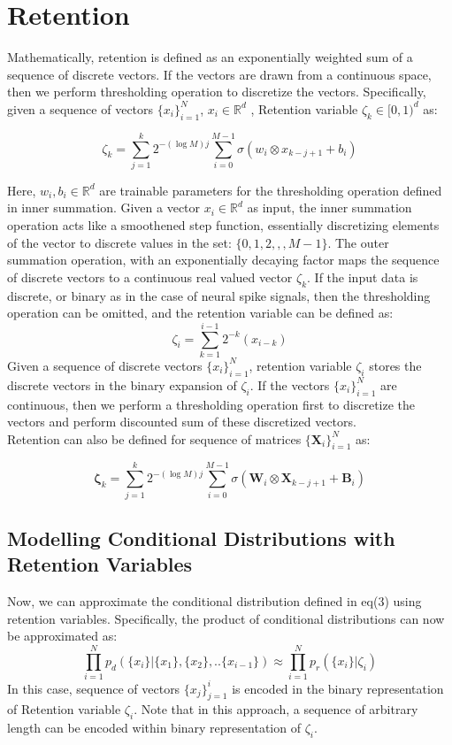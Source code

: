 \section{Retention}
Mathematically, retention is defined as an exponentially weighted sum of a sequence of discrete vectors. If the vectors are drawn from a continuous space, then we perform thresholding operation to discretize the vectors. 
Specifically, given a sequence of vectors $\{x_i\}_{i=1}^N$, $x_i \in \mathbb{R}^d$ , Retention variable $ \zeta_k \in [0,1)^d$ as:

\begin{equation}
    \zeta_k = \sum_{j=1}^{k} 2^{- (\log M)j} \sum_{i=0}^{M-1} \sigma(w_i \otimes x_{k-j+1} + b_i)
\end{equation}


Here, $w_i, b_i \in \mathbb{R}^d$ are trainable parameters for the thresholding operation defined in inner summation. Given a vector $x_i \in \mathbb{R}^d$ as input, the inner summation operation acts like a smoothened step function, essentially discretizing elements of the vector to discrete values in the set: $\{0,1,2,,,M-1\}$. The outer summation operation, with an exponentially decaying factor maps the sequence of discrete vectors to a continuous real valued vector $\zeta_k$. If the input data is discrete, or binary as in the case of neural spike signals, then the thresholding operation can be omitted, and the retention variable can be defined as: 
\begin{equation}
    \zeta_i = \sum_{k=1}^{i-1} 2^{-k} (x_{i-k}) 
\end{equation}
Given a sequence of discrete vectors $\{x_i\}_{i=1}^N$, retention variable $\zeta_i$ stores the discrete vectors in the binary expansion of $\zeta_i$. If the vectors  $\{x_i\}_{i=1}^N$ are continuous, then we perform a thresholding operation first to discretize the vectors and perform discounted sum of these discretized vectors. \\

Retention can also be defined for sequence of matrices $\{\mathbf{X}_i\}_{i=1}^N$ as:

\begin{equation}
    \mathbf{\zeta}_k = \sum_{j=1}^{k} 2^{- (\log M)j} \sum_{i=0}^{M-1} \sigma(\mathbf{W}_i \otimes \mathbf{X}_{k-j+1} + \mathbf{B}_i)
\end{equation}

\subsection{Modelling Conditional Distributions with Retention Variables}
Now, we can approximate the conditional distribution defined in eq(3) using retention variables. Specifically, the product of conditional distributions can now be approximated as:
\begin{equation}
   \prod_{i=1}^{N} p_d(\{x_{i}\}| \{x_1\},\{x_2\},..\{x_{i-1}\}) 
   \approx  \prod_{i=1}^{N} p_r(\{x_{i}\}|\zeta_i)
\end{equation}
In this case, sequence of vectors $\{x_j\}_{j=1}^i$ is encoded in the binary representation of Retention variable $\zeta_i$. Note that in this approach, a sequence of arbitrary length can be encoded within binary representation of $\zeta_i$. 
